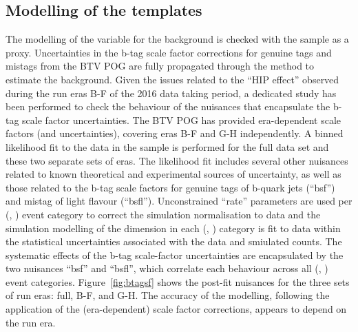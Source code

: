 \subsection{Modelling of the \texorpdfstring{\nb}{Nb} templates}
\label{sec:nb-zinv}

The modelling of the \nb variable for the \znunuj background is
checked with the \mmj sample as a proxy. Uncertainties in the b-tag
scale factor corrections for genuine tags and mistags from the BTV POG
are fully propagated through the method to estimate the \znunuj
background. Given the issues related to the ``HIP effect'' observed
during the run eras B-F of the 2016 data taking period, a dedicated
study has been performed to check the behaviour of the nuisances that
encapsulate the b-tag scale factor uncertainties. The BTV POG has
provided era-dependent scale factors (and uncertainties), covering
eras B-F and G-H independently. A binned likelihood fit to the data in
the \mmj sample is performed for the full data set and these two
separate sets of eras. The likelihood fit includes several other
nuisances related to known theoretical and experimental sources of
uncertainty, as well as those related to the b-tag scale factors for
genuine tags of b-quark jets (``bsf'') and mistag of light flavour
(``bsfl''). Unconstrained ``rate'' parameters are used per (\njet,
\scalht) event category to correct the simulation normalisation to
data and the simulation modelling of the \nb dimension in each (\njet,
\scalht) category is fit to data within the statistical uncertainties
associated with the data and smiulated counts. The systematic effects
of the b-tag scale-factor uncertainties are encapsulated by the two
nuisances ``bsf'' and ``bsfl'', which correlate each behaviour across
all (\njet, \scalht) event categories. Figure~\ref{fig:btagsf} shows
the post-fit nuisances for the three sets of run eras: full, B-F, and
G-H. The accuracy of the \nb modelling, following the application of
the (era-dependent) scale factor corrections, appears to depend on the
run era.

